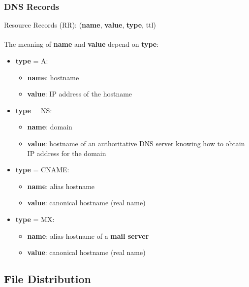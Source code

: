 \documentclass[12pt]{article}
\begin{document}
\subsubsection{DNS Records}

Resource Records (RR): (\textbf{name}, \textbf{value}, \textbf{type}, ttl) \\\\
The meaning of \textbf{name} and \textbf{value} depend on \textbf{type}:

\begin{itemize}[topsep=0pt, itemsep=0pt]
    \item \textbf{type} = A:
        \begin{itemize}[topsep=0pt, itemsep=0pt]
            \item \textbf{name}: hostname
            \item \textbf{value}: IP address of the hostname
        \end{itemize}
    \item \textbf{type} = NS:
        \begin{itemize}[topsep=0pt, itemsep=0pt]
            \item \textbf{name}: domain
            \item \textbf{value}: hostname of an authoritative DNS server knowing how to obtain IP address for the domain
        \end{itemize}
    \item \textbf{type} = CNAME:
        \begin{itemize}[topsep=0pt, itemsep=0pt]
            \item \textbf{name}: alias hostname
            \item \textbf{value}: canonical hostname (real name)
        \end{itemize}
    \item \textbf{type} = MX:
        \begin{itemize}[topsep=0pt, itemsep=0pt]
            \item \textbf{name}: alias hostname of a \textbf{mail server}
            \item \textbf{value}: canonical hostname (real name)
        \end{itemize}
\end{itemize}

\subsection{File Distribution}
\end{document}
